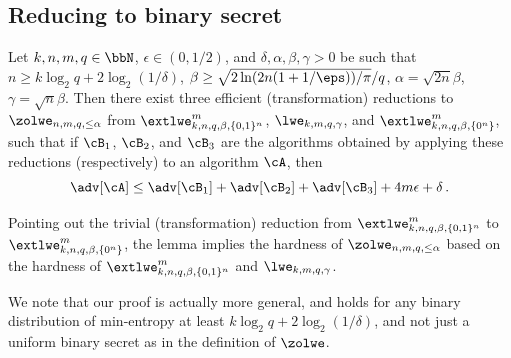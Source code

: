 

\subsection{Reducing to binary secret}\label{sec:theshortsecretreduction}

\begin{lemma}\label{lem:zolwe}
Let $k,n,m,q \in \bbN$, $\epsilon \in (0,1/2)$, and $\delta,\alpha,\beta,\gamma>0$ be such that $n \ge k \log_2 q + 2 \log_2 (1/\delta)$, $\beta \ge \sqrt{2 \ln(2n(1+1/\eps))/\pi}/q$, $\alpha = \sqrt{2n} \beta$, $\gamma = \sqrt{n}\beta$. 
Then there exist three efficient (transformation) reductions to $\zolwe_{n,m,q,\le\alpha}$ from 
$\extlwe^m_{k,n,q,\beta,\{0,1\}^n}$, $\lwe_{k,m,q,\gamma}$, and  $\extlwe^m_{k,n,q,\beta,\{0^n\}}$,
such that if $\cB_1$, $\cB_2$, and $\cB_3$ are the algorithms obtained by applying these reductions (respectively) 
to an algorithm $\cA$, then
\[
\adv[\cA] \le \adv[\cB_1]+\adv[\cB_2]+\adv[\cB_3]+4m\epsilon + \delta \,.
\]
\end{lemma}

Pointing out the trivial (transformation) reduction from $\extlwe^m_{k,n,q,\beta,\{0,1\}^n}$ to $\extlwe^m_{k,n,q,\beta,\{0^n\}}$, the lemma implies the hardness of $\zolwe_{n,m,q,\le\alpha}$ based on the hardness of $\extlwe^m_{k,n,q,\beta,\{0,1\}^n}$ and $\lwe_{k,m,q,\gamma}$.

We note that our proof is actually more general, and holds for any binary distribution of
min-entropy at least $k \log_2 q + 2 \log_2 (1/\delta)$, and not just a uniform binary secret as in the definition of $\zolwe$.


\def\veh{\hat{\vc{e}}}


